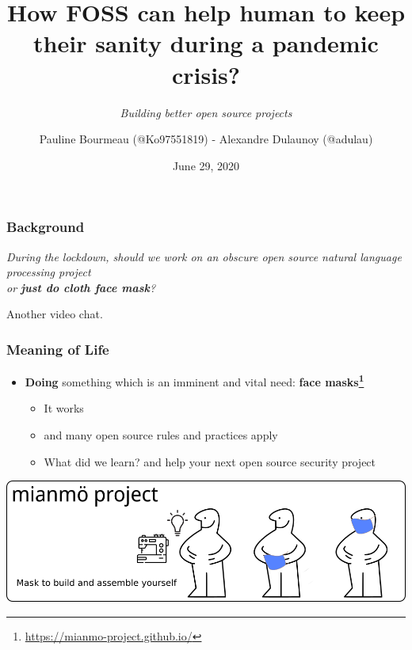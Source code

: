 \documentclass{beamer}
\title{How FOSS can help human to keep their sanity during a pandemic crisis?}
\subtitle{{\it Building better open source projects}}
\author{Pauline Bourmeau (@Ko97551819) - Alexandre Dulaunoy (@adulau)}
\date{June 29, 2020}
\begin{document}
	\setcounter{showProgressBar}{0}
	\setcounter{showSlideNumbers}{0}

	\frame{\titlepage}

\begin{frame}[fragile]
        \frametitle{Background}
            {\center \it \Large During the lockdown, should we work on an obscure open source natural language processing project\\ or {\bf just do cloth face mask}?\\}
        \begin{flushright}
        Another video chat.
        \end{flushright}
    \end{frame}

\begin{frame}[fragile]
        \frametitle{Meaning of Life}
        \begin{itemize}
                \item {\bf Doing} something which is an imminent and vital need: {\bf face masks\footnote{\url{https://mianmo-project.github.io/}}}
                        \begin{itemize}
                \item It works
                \item and many open source rules and practices apply
                \item What did we learn? and help your next open source security project
                        \end{itemize}
        \end{itemize}
        \includegraphics[scale=0.08]{./images/project.png}
    \end{frame}
\end{document}
